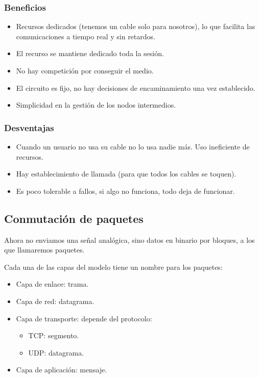 \subsubsection{Beneficios}
\begin{itemize}
    \item Recursos dedicados (tenemos un cable solo para nosotros), lo que facilita las comunicaciones a tiempo real y sin retardos.
    \item El recurso se mantiene dedicado toda la sesión.
    \item No hay competición por conseguir el medio.
    \item El circuito es fijo, no hay decisiones de encaminamiento una vez establecido.
    \item Simplicidad en la gestión de los nodos intermedios.
\end{itemize}

\subsubsection{Desventajas}
\begin{itemize}
    \item Cuando un usuario no usa su cable no lo usa nadie más. Uso ineficiente de recursos.
    \item Hay establecimiento de llamada (para que todos los cables se toquen).
    \item Es poco tolerable a fallos, si algo no funciona, todo deja de funcionar.
\end{itemize}

\subsection{Conmutación de paquetes}
Ahora no enviamos una señal analógica, sino datos en binario por bloques, a los que llamaremos paquetes. 

\begin{observacion}
    Cada una de las capas del modelo tiene un nombre para los paquetes:
    \begin{itemize}
        \item Capa de enlace: trama.
        \item Capa de red: datagrama.
        \item Capa de transporte: depende del protocolo:
            \begin{itemize}
                \item \acrshort{TCP}\@: segmento.
                \item \acrshort{UDP}\@: datagrama.
            \end{itemize}
        \item Capa de aplicación: mensaje. 
    \end{itemize}
\end{observacion}

